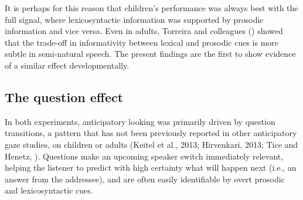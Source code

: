 \documentclass[authoryear, 12pt]{elsarticle}
\begin{document}
It is perhaps for this reason that children's performance was always best with the full signal, where lexicosyntactic information was supported by prosodic information and vice versa. Even in adults, Torreira and colleagues (\citeyear{torreira2015}) showed that the trade-off in informativity between lexical and prosodic cues is more subtle in semi-natural speech. The present findings are the first to show evidence of a similar effect developmentally.


\subsection*{The question effect}

In both experiments, anticipatory looking was primarily driven by question transitions, a pattern that has not been previously reported in other anticipatory gaze studies, on children or adults (Keitel et al., 2013; Hirvenkari, 2013; Tice and Henetz, \citeyear{TiceHenetz11}). Questions make an upcoming speaker switch immediately relevant, helping the listener to predict with high certainty what will happen next (i.e., an answer from the addressee), and are often easily identifiable by overt prosodic and lexicosyntactic cues.
\end{document}
